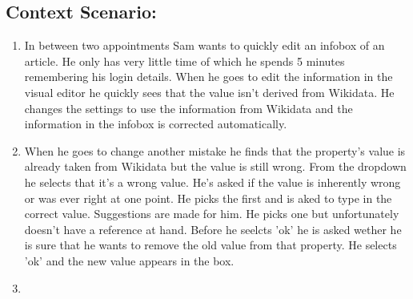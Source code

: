 \documentclass{article}
\begin{document}
\subsection{Context Scenario:}
\begin{enumerate}
\item In between two appointments Sam wants to quickly edit an infobox of an article. He only has very little time of which he spends 5 minutes remembering his login details. When he goes to edit the information in the visual editor he quickly sees that the value isn't derived from Wikidata. He changes the settings to use the information from Wikidata and the information in the infobox is corrected automatically. 
\item When he goes to change another mistake he finds that the property's value is already taken from Wikidata but the value is still wrong. From the dropdown he selects that it's a wrong value. He's asked if the value is inherently wrong or was ever right at one point. He picks the first and is aked to type in the correct value. Suggestions are made for him. He picks one but unfortunately doesn't have a reference at hand. Before he seelcts 'ok' he is asked wether he is sure that he wants to remove the old value from that property. He selects 'ok' and the new value appears in the box.
\item
\end{enumerate}
\end{document}
